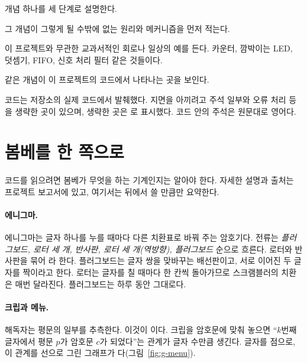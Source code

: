 개념 하나를 세 단계로 설명한다.

\Why 그 개념이 그렇게 될 수밖에 없는 원리와 메커니즘을 먼저 적는다.

\General 이 프로젝트와 무관한 교과서적인 회로나 일상의 예를 든다. 카운터, 깜박이는 LED, 덧셈기, FIFO,
신호 처리 필터 같은 것들이다.

\Ours 같은 개념이 이 프로젝트의 코드에서 나타나는 곳을 보인다.

코드는 저장소의 실제 코드에서 발췌했다. 지면을 아끼려고 주석 일부와 오류 처리 등을 생략한 곳이 있으며,
생략한 곳은 로 표시했다. 코드 안의 주석은 원문대로 영어다.

\section{봄베를 한 쪽으로}\label{sec:bombe-one-page}

코드를 읽으려면 봄베가 무엇을 하는 기계인지는 알아야 한다. 자세한 설명과 출처는 프로젝트 보고서에 있고,
여기서는 뒤에서 쓸 만큼만 요약한다.

\paragraph{에니그마.} 에니그마는 글자 하나를 누를 때마다 다른 치환표로 바꿔 주는 암호기다. 전류는
\emph{플러그보드, 로터 세 개, 반사판, 로터 세 개(역방향), 플러그보드} 순으로 흐른다. 로터와 반사판을 묶어
라 한다. 플러그보드는 글자 쌍을 맞바꾸는 배선판이고, 서로 이어진 두 글자를
 짝이라고 한다. 로터는 글자를 칠 때마다 한 칸씩 돌아가므로 스크램블러의 치환은
매번 달라진다. 플러그보드는 하루 동안 그대로다.

\paragraph{크립과 메뉴.} 해독자는 평문의 일부를 추측한다. 이것이 이다. 크립을 암호문에
맞춰 놓으면 ``$k$번째 글자에서 평문 $p$가 암호문 $c$가 되었다''는 관계가 글자 수만큼 생긴다. 글자를
점으로, 이 관계를 선으로 그린 그래프가 다(그림~\ref{fig:g-menu}).

